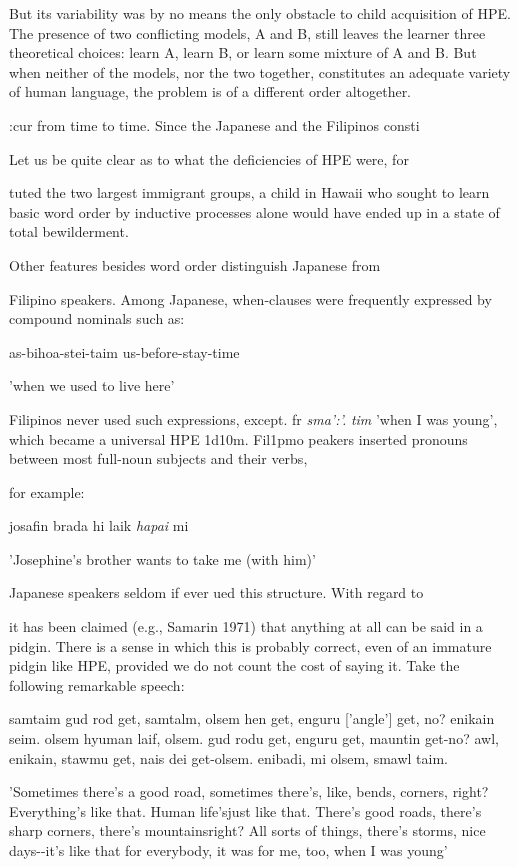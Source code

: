 But its variability was by no means the only obstacle to child acquisition of HPE. The presence of two conflicting models, A and B, still leaves the learner three theoretical choices: learn A, learn B, or learn some mixture of A and B. But when neither of the models, nor the two together, constitutes an adequate variety of human language, the problem is of a different order altogether.

:cur from time to time. Since the Japanese and the Filipinos consti\-

Let us be quite clear as to what the deficiencies of HPE were, for

tuted the two largest immigrant groups, a child in Hawaii who sought to learn basic word order by inductive processes alone would have ended up in a state of total bewilderment.

Other features besides word order distinguish Japanese from

Filipino speakers. Among Japanese, when-clauses were frequently expressed by compound nominals such as:

\ea\label{ex:10}
as-bihoa-stei-taim us-before-stay-time
\glt
\z

'when we used to live here'

Filipinos never used such expressions, except. fr \textit{sma':'.} \textit{tim} 'when I was young', which became a universal HPE 1d10m. Fil1pmo peakers inserted pronouns between most full-noun subjects and their verbs,

for example:

\ea\label{ex:11}
josafin brada hi laik \textit{hapai} mi
\glt
\z

'Josephine's brother wants to take me (with him)'

Japanese speakers seldom if ever ued this structure. With regard to

it has been claimed (e.g., Samarin 1971) that anything at all can be said in a pidgin. There is a sense in which this is probably correct, even of an immature pidgin like HPE, provided we do not count the cost of saying it. Take the following remarkable speech:

\ea\label{ex:12}
samtaim gud rod get, samtalm, olsem hen get, enguru ['angle'] get, no? enikain seim. olsem hyuman laif, olsem. gud rodu get, enguru get, mauntin get-no? awl, enikain, stawmu get, nais dei get-olsem. enibadi, mi olsem, smawl taim.
\glt
\z

'Sometimes there's a good road, sometimes there's, like, bends, corners, right? Everything's like that. Human life'sjust like that. There's good roads, there's sharp corners, there's mountains\-right? All sorts of things, there's storms, nice days-{}-it's like that for everybody, it was for me, too, when I was young'

